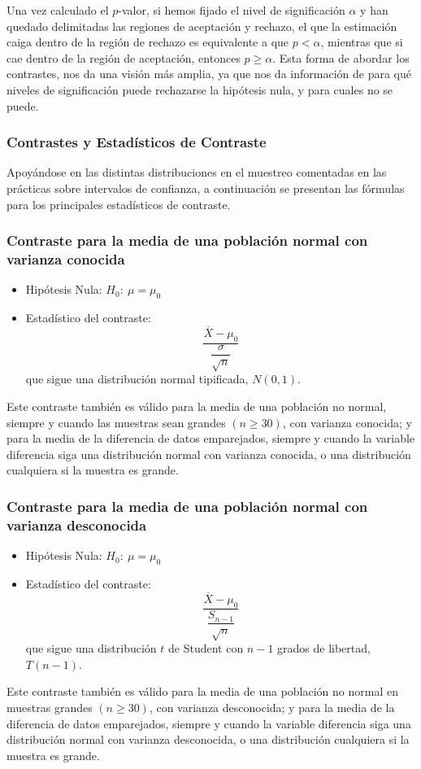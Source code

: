 Una vez calculado el $p$-valor, si hemos fijado el nivel de significación $\alpha$ y han quedado delimitadas las
regiones de aceptación y rechazo, el que la estimación caiga dentro de la región de rechazo es equivalente a que
$p<\alpha$, mientras que si cae dentro de la región de aceptación, entonces $p\geq \alpha$.
Esta forma de abordar los contrastes, nos da una visión más amplia, ya que nos da información de para qué niveles de
significación puede rechazarse la hipótesis nula, y para cuales no se puede.


\subsubsection{Contrastes y Estadísticos de Contraste}
Apoyándose en las distintas distribuciones en el muestreo comentadas en las prácticas sobre intervalos de confianza, a
continuación se presentan las fórmulas para los principales estadísticos de contraste.

\subsubsection{Contraste para la media de una población normal con varianza conocida}
\begin{itemize}
\item Hipótesis Nula: $H_0:\ \mu=\mu_0$
\item Estadístico del contraste:
\[
\dfrac{\overline{X}-\mu_0 }{\dfrac{\sigma }{\sqrt{n}}}
\]
que sigue una distribución normal tipificada, $N(0,1)$.
\end{itemize}
Este contraste también es válido para la media de una población no normal, siempre y cuando las muestras sean grandes
$(n\geq 30)$, con varianza conocida; y para la media de la diferencia de datos emparejados, siempre y cuando la variable
diferencia siga una distribución normal con varianza conocida, o una distribución cualquiera si la muestra es grande.

\subsubsection{Contraste para la media de una población normal con varianza desconocida}
\begin{itemize}
\item Hipótesis Nula: $H_0:\ \mu=\mu_0$
\item Estadístico del contraste:
\[
\dfrac{\overline{X}-\mu_0}{\dfrac{S_{n-1}}{\sqrt{n}}}
\]
que sigue una distribución $t$ de Student con $n-1$ grados de libertad, $T(n-1)$.
\end{itemize}
Este contraste también es válido para la media de una población no normal en muestras grandes $(n\geq 30)$, con varianza
desconocida; y para la media de la diferencia de datos emparejados, siempre y cuando la variable diferencia siga una
distribución normal con varianza desconocida, o una distribución cualquiera si la muestra es grande.

